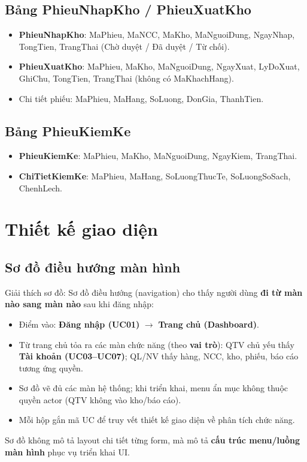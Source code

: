 \subsection{Bảng PhieuNhapKho / PhieuXuatKho}

\begin{itemize}[leftmargin=1.5cm]
    \item \textbf{PhieuNhapKho}: MaPhieu, MaNCC, MaKho, MaNguoiDung, NgayNhap, TongTien, TrangThai (Chờ duyệt / Đã duyệt / Từ chối).
    \item \textbf{PhieuXuatKho}: MaPhieu, MaKho, MaNguoiDung, NgayXuat, LyDoXuat, GhiChu, TongTien, TrangThai (không có MaKhachHang).
    \item Chi tiết phiếu: MaPhieu, MaHang, SoLuong, DonGia, ThanhTien.
\end{itemize}

\subsection{Bảng PhieuKiemKe}

\begin{itemize}[leftmargin=1.5cm]
    \item \textbf{PhieuKiemKe}: MaPhieu, MaKho, MaNguoiDung, NgayKiem, TrangThai.
    \item \textbf{ChiTietKiemKe}: MaPhieu, MaHang, SoLuongThucTe, SoLuongSoSach, ChenhLech.
\end{itemize}

\section{Thiết kế giao diện}

\subsection{Sơ đồ điều hướng màn hình}



Giải thích sơ đồ: Sơ đồ điều hướng (navigation) cho thấy người dùng \textbf{đi từ màn nào sang màn nào} sau khi đăng nhập:
\begin{itemize}[leftmargin=1.5cm]
    \item Điểm vào: \textbf{Đăng nhập (UC01)} $\rightarrow$ \textbf{Trang chủ (Dashboard)}.
    \item Từ trang chủ tỏa ra các màn chức năng (theo \textbf{vai trò}): QTV chủ yếu thấy \textbf{Tài khoản (UC03--UC07)}; QL/NV thấy hàng, NCC, kho, phiếu, báo cáo tương ứng quyền.
    \item Sơ đồ vẽ đủ các màn hệ thống; khi triển khai, menu ẩn mục không thuộc quyền actor (QTV không vào kho/báo cáo).
    \item Mỗi hộp gắn mã UC để truy vết thiết kế giao diện về phân tích chức năng.
\end{itemize}
Sơ đồ không mô tả layout chi tiết từng form, mà mô tả \textbf{cấu trúc menu/luồng màn hình} phục vụ triển khai UI.


